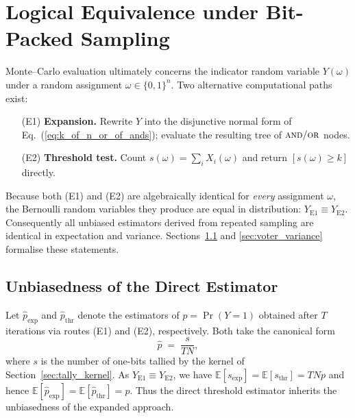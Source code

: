 \section{Logical Equivalence under Bit-Packed Sampling}
\label{sec:voter_equivalence}

Monte–Carlo evaluation ultimately concerns the indicator random variable
$Y(\omega)$ under a random assignment $\omega\in\{0,1\}^{n}$.  Two alternative
computational paths exist:
\begin{enumerate}
  \item[(E1)] \textbf{Expansion.}  Rewrite $Y$ into the disjunctive normal form
        of Eq.~(\ref{eq:k_of_n_or_of_ands}); evaluate the resulting tree of
        $\textsc{and}/\textsc{or}$ nodes.
  \item[(E2)] \textbf{Threshold test.}  Count $s(\omega)=\sum_i X_i(\omega)$
        and return $[s(\omega)\ge k]$ directly.
\end{enumerate}
Because both (E1) and (E2) are algebraically identical for \emph{every}
assignment $\omega$, the Bernoulli random variables they produce are equal in
distribution:
\(
  Y_{\mathrm{E1}}\equiv Y_{\mathrm{E2}}.
\)
Consequently all unbiased estimators derived from repeated sampling are
identical in expectation and variance.  Sections~\ref{sec:voter_unbiased} and
\ref{sec:voter_variance} formalise these statements.

\subsection{Unbiasedness of the Direct Estimator}
\label{sec:voter_unbiased}

Let $\widehat{p}_\text{exp}$ and $\widehat{p}_\text{thr}$ denote the
estimators of $p=\Pr(Y=1)$ obtained after $T$ iterations via routes (E1) and
(E2), respectively.  Both take the canonical form
\[
  \widehat{p}\;=\;\frac{s}{T N},
\]
where $s$ is the number of one-bits tallied by the kernel of
Section~\ref{sec:tally_kernel}.  As $Y_{\mathrm{E1}}\equiv Y_{\mathrm{E2}}$, we
have $\mathbb{E}[s_{\mathrm{exp}}]=\mathbb{E}[s_{\mathrm{thr}}]=T N p$ and hence
\(
  \mathbb{E}[\widehat{p}_\text{exp}] =\mathbb{E}[\widehat{p}_\text{thr}] = p.
\)
Thus the direct threshold estimator inherits the unbiasedness of the expanded
approach.

